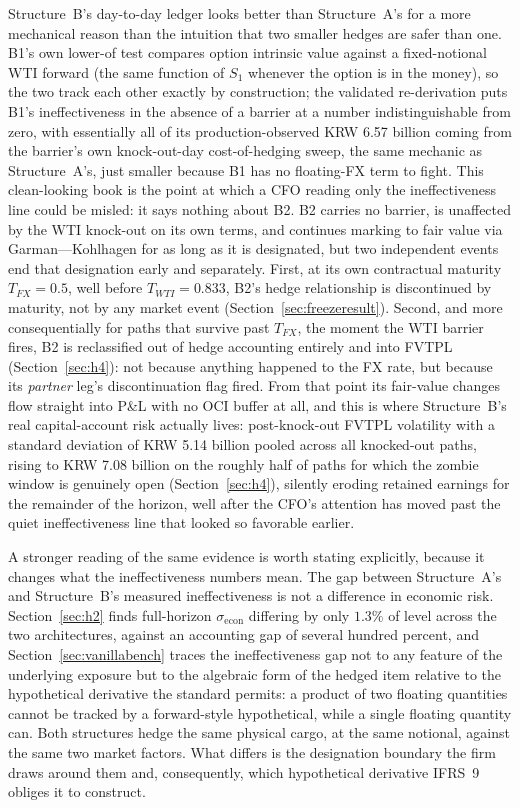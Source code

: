 \documentclass[11pt,a4paper]{article}
\begin{document}
Structure~B's day-to-day ledger looks better than Structure~A's for a more mechanical reason than the intuition that two smaller hedges are safer than one. B1's own lower-of test compares option intrinsic value against a fixed-notional WTI forward (the same function of $S_1$ whenever the option is in the money), so the two track each other exactly by construction; the validated re-derivation puts B1's ineffectiveness in the absence of a barrier at a number indistinguishable from zero, with essentially all of its production-observed KRW 6.57 billion coming from the barrier's own knock-out-day cost-of-hedging sweep, the same mechanic as Structure~A's, just smaller because B1 has no floating-FX term to fight. This clean-looking book is the point at which a CFO reading only the ineffectiveness line could be misled: it says nothing about B2. B2 carries no barrier, is unaffected by the WTI knock-out on its own terms, and continues marking to fair value via Garman---Kohlhagen for as long as it is designated, but two independent events end that designation early and separately. First, at its own contractual maturity $T_{FX}=0.5$, well before $T_{WTI}=0.833$, B2's hedge relationship is discontinued by maturity, not by any market event (Section~\ref{sec:freezeresult}). Second, and more consequentially for paths that survive past $T_{FX}$, the moment the WTI barrier fires, B2 is reclassified out of hedge accounting entirely and into FVTPL (Section~\ref{sec:h4}): not because anything happened to the FX rate, but because its \emph{partner} leg's discontinuation flag fired. From that point its fair-value changes flow straight into P\&L with no OCI buffer at all, and this is where Structure~B's real capital-account risk actually lives: post-knock-out FVTPL volatility with a standard deviation of KRW 5.14 billion pooled across all knocked-out paths, rising to KRW 7.08 billion on the roughly half of paths for which the zombie window is genuinely open (Section~\ref{sec:h4}), silently eroding retained earnings for the remainder of the horizon, well after the CFO's attention has moved past the quiet ineffectiveness line that looked so favorable earlier.

A stronger reading of the same evidence is worth stating explicitly, because it changes what the ineffectiveness numbers mean. The gap between Structure~A's and Structure~B's measured ineffectiveness is not a difference in economic risk. Section~\ref{sec:h2} finds full-horizon $\sigma_{\mathrm{econ}}$ differing by only $1.3\%$ of level across the two architectures, against an accounting gap of several hundred percent, and Section~\ref{sec:vanillabench} traces the ineffectiveness gap not to any feature of the underlying exposure but to the algebraic form of the hedged item relative to the hypothetical derivative the standard permits: a product of two floating quantities cannot be tracked by a forward-style hypothetical, while a single floating quantity can. Both structures hedge the same physical cargo, at the same notional, against the same two market factors. What differs is the designation boundary the firm draws around them and, consequently, which hypothetical derivative IFRS~9 obliges it to construct.
\end{document}
